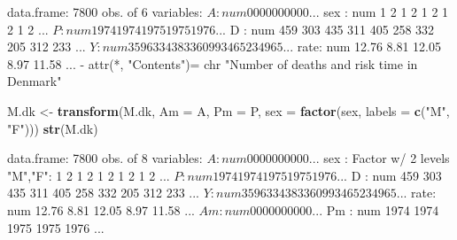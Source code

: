 \documentclass[
]{book}
\newenvironment{Shaded}{\begin{snugshade}}{\end{snugshade}}
\newcommand{\AttributeTok}[1]{\textcolor[rgb]{0.13,0.29,0.53}{#1}}
\newcommand{\FloatTok}[1]{\textcolor[rgb]{0.00,0.00,0.81}{#1}}
\newcommand{\FunctionTok}[1]{\textcolor[rgb]{0.13,0.29,0.53}{\textbf{#1}}}
\newcommand{\NormalTok}[1]{#1}
\newcommand{\OtherTok}[1]{\textcolor[rgb]{0.56,0.35,0.01}{#1}}
\newcommand{\SpecialCharTok}[1]{\textcolor[rgb]{0.81,0.36,0.00}{\textbf{#1}}}
\newcommand{\StringTok}[1]{\textcolor[rgb]{0.31,0.60,0.02}{#1}}
\begin{document}
\begin{enumerate}
\begin{Shaded}
\end{Shaded}

\begin{Shaded}
\begin{Highlighting}[]
\NormalTok{\textquotesingle{}data.frame\textquotesingle{}:   7800 obs. of  6 variables:}
\NormalTok{ $ A   : num  0 0 0 0 0 0 0 0 0 0 ...}
\NormalTok{ $ sex : num  1 2 1 2 1 2 1 2 1 2 ...}
\NormalTok{ $ P   : num  1974 1974 1975 1975 1976 ...}
\NormalTok{ $ D   : num  459 303 435 311 405 258 332 205 312 233 ...}
\NormalTok{ $ Y   : num  35963 34383 36099 34652 34965 ...}
\NormalTok{ $ rate: num  12.76 8.81 12.05 8.97 11.58 ...}
\NormalTok{ {-} attr(*, "Contents")= chr "Number of deaths and risk time in Denmark"}
\end{Highlighting}
\end{Shaded}

\begin{Shaded}
\begin{Highlighting}[]
\NormalTok{M.dk }\OtherTok{\textless{}{-}} \FunctionTok{transform}\NormalTok{(M.dk,}
                  \AttributeTok{Am =}\NormalTok{ A,}
                  \AttributeTok{Pm =}\NormalTok{ P,}
                 \AttributeTok{sex =} \FunctionTok{factor}\NormalTok{(sex, }\AttributeTok{labels =} \FunctionTok{c}\NormalTok{(}\StringTok{"M"}\NormalTok{, }\StringTok{"F"}\NormalTok{)))}
\FunctionTok{str}\NormalTok{(M.dk)}
\end{Highlighting}
\end{Shaded}

\begin{Shaded}
\begin{Highlighting}[]
\NormalTok{\textquotesingle{}data.frame\textquotesingle{}:   7800 obs. of  8 variables:}
\NormalTok{ $ A   : num  0 0 0 0 0 0 0 0 0 0 ...}
\NormalTok{ $ sex : Factor w/ 2 levels "M","F": 1 2 1 2 1 2 1 2 1 2 ...}
\NormalTok{ $ P   : num  1974 1974 1975 1975 1976 ...}
\NormalTok{ $ D   : num  459 303 435 311 405 258 332 205 312 233 ...}
\NormalTok{ $ Y   : num  35963 34383 36099 34652 34965 ...}
\NormalTok{ $ rate: num  12.76 8.81 12.05 8.97 11.58 ...}
\NormalTok{ $ Am  : num  0 0 0 0 0 0 0 0 0 0 ...}
\NormalTok{ $ Pm  : num  1974 1974 1975 1975 1976 ...}
\end{Highlighting}
\end{Shaded}


\end{enumerate}
\end{document}
